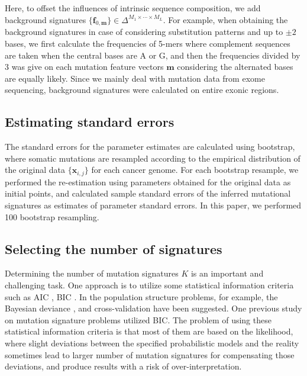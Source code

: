 Here, to offset the influences of intrinsic sequence composition, we add background signatures 
$\{ \bm{f}_{0, \bm{m}} \} \in \Delta^{M_1 \times  \cdots \times M_L}$.
For example, when obtaining the background signatures in case of considering substitution patterns and up to $\pm 2$ bases, 
we first calculate the frequencies of 5-mers where complement sequences are taken when the central bases are A or G,
and then the frequencies divided by 3 was give on each mutation feature vectors $\bm{m}$
considering the alternated bases are equally likely.
Since we mainly deal with mutation data from exome sequencing,
background signatures were calculated on entire exonic regions.


\subsection*{Estimating standard errors}

The standard errors for the parameter estimates are calculated using bootstrap, 
where somatic mutations are resampled according to the empirical distribution of the original data $\{ \bm{x}_{i,j} \}$ for each cancer genome.
For each bootstrap resample, we performed the re-estimation using parameters obtained for the original data as initial points,
and calculated sample standard errors of the inferred mutational signatures as estimates of parameter standard errors.
In this paper, we performed 100 bootstrap resampling.


\subsection*{Selecting the number of signatures}

Determining the number of mutation signatures $K$ is an important and challenging task. 
One approach is to utilize some statistical information criteria such as AIC \cite{akaike1974new}, BIC \cite{schwarz1978estimating}.
In the population structure problems, for example, 
the Bayesian deviance \cite{pmid10835412}, 
and cross-validation \cite{alexander2011enhancements} have been suggested.
One previous study on mutation signature problems \cite{pmid23628380} utilized BIC.
The problem of using these statistical information criteria is that most of them are based on the likelihood,
where slight deviations between the specified probabilistic models and the reality sometimes lead to 
larger number of mutation signatures for compensating those deviations,
and produce results with a risk of over-interpretation.

